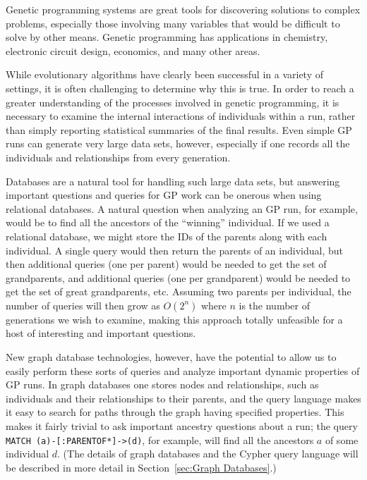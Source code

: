 \documentclass[12pt]{article}
\begin{document}
Genetic programming systems are great tools for discovering solutions to complex problems, especially those involving many variables that would be difficult to solve by other means. Genetic programming has applications in chemistry, electronic circuit design, economics, and many other areas. 

While evolutionary algorithms have clearly been successful in a variety of settings, it is often challenging to determine why this is true. In order to reach a greater understanding of the processes involved in genetic programming, it is necessary to examine the internal interactions of individuals within a run, rather than simply reporting statistical summaries of the final results. Even simple GP runs can generate very large data sets, however, especially if one records all the individuals and relationships from every generation.

Databases are a natural tool for handling such large data sets, but answering important questions and queries for GP work can be onerous when using relational databases. A natural question when analyzing an GP run, for example, would be to find all the ancestors of the ``winning'' individual. If we used a relational database, we might store the IDs of the parents along with each individual. A single query would then return the parents of an individual, but then additional queries (one per parent) would be needed to get the set of grandparents, and additional queries (one per grandparent) would be needed to get the set of great grandparents, etc. Assuming two parents per individual, the number of queries will then grow as $O(2^n)$ where $n$ is the number of generations we wish to examine, making this approach totally unfeasible for a host of interesting and important questions.

New graph database technologies, however, have the potential to allow us to easily perform these sorts of queries and analyze important dynamic properties of GP runs. In graph databases one stores nodes and relationships, such as individuals and their relationships to their parents, and the query language makes it easy to search for paths through the graph having specified properties. This makes it fairly trivial to ask important ancestry questions about a run; the query \texttt{MATCH (a)-[:PARENTOF*]->(d)}, for example, will find all the ancestors $a$ of some individual $d$. (The details of graph databases and the Cypher query language will be described in more detail in Section~\ref{sec:Graph Databases}.)
\end{document}
